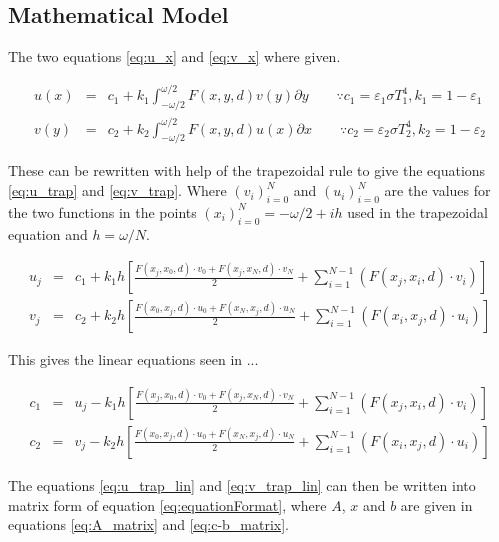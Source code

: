\subsection{Mathematical Model}
The two equations \ref{eq:u_x} and \ref{eq:v_x} where given.


\begin{eqnarray}
u(x) &=& c_1 + k_1 \int^{\omega/2}_{-\omega/2} F(x,y,d)v(y) \partial y \qquad \because c_1 = \varepsilon_1  \sigma T_1^4, k_1 = 1 - \varepsilon_1 \label{eq:u_x} \\
v(y) &=& c_2 + k_2 \int^{\omega/2}_{-\omega/2} F(x,y,d)u(x) \partial x \qquad \because c_2 = \varepsilon_2  \sigma T_2^4, k_2 = 1 - \varepsilon_2 \label{eq:v_x}
\end{eqnarray}

These can be rewritten with help of the trapezoidal rule to give the equations \ref{eq:u_trap} and \ref{eq:v_trap}.
Where $(v_i)_{i=0}^N$ and $(u_i)_{i=0}^N$ are the values for the two functions in the points $(x_i)_{i=0}^N = -\omega/2 + i h$ used in the trapezoidal equation and $h = \omega/N$.

\begin{eqnarray}
u_j &=& c_1 + k_1 h \left[ \frac{F(x_j, x_0, d) \cdot v_0 + F(x_j, x_N, d) \cdot v_N}{2} + \sum_{i = 1}^{N-1} \left( F(x_j, x_i, d) \cdot v_i \right) \right] \label{eq:u_trap}\\
v_j &=& c_2 + k_2 h \left[ \frac{F(x_0, x_j, d) \cdot u_0 + F(x_N, x_j, d) \cdot u_N}{2} + \sum_{i = 1}^{N-1} \left( F(x_i, x_j, d) \cdot u_i \right) \right] \label{eq:v_trap}
\end{eqnarray}

This gives the linear equations seen in ...

\begin{eqnarray}
c_1 &=& u_j - k_1 h \left[ \frac{F(x_j, x_0, d) \cdot v_0 + F(x_j, x_N, d) \cdot v_N}{2} + \sum_{i = 1}^{N-1} \left( F(x_j, x_i, d) \cdot v_i \right) \right] \label{eq:u_trap_lin}\\
c_2 &=& v_j - k_2 h \left[ \frac{F(x_0, x_j, d) \cdot u_0 + F(x_N, x_j, d) \cdot u_N}{2} + \sum_{i = 1}^{N-1} \left( F(x_i, x_j, d) \cdot u_i \right) \right] \label{eq:v_trap_lin}
\end{eqnarray}


The equations \ref{eq:u_trap_lin} and \ref{eq:v_trap_lin} can then be written into matrix form of equation \ref{eq:equationFormat}, where $A$, $x$ and $b$ are given in equations \ref{eq:A_matrix} and \ref{eq:c-b_matrix}.

